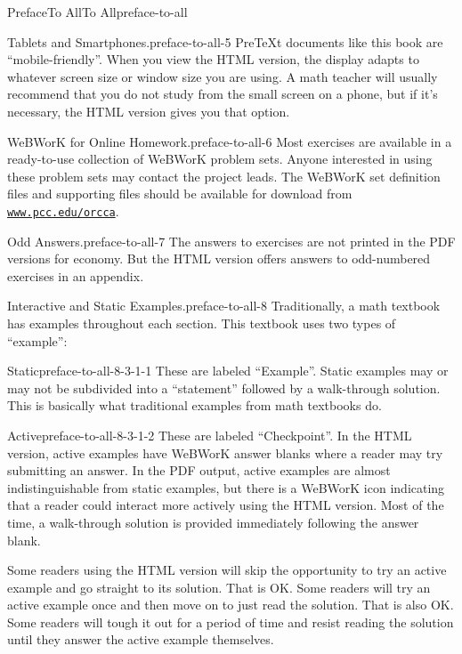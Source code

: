 \documentclass[twoside,10pt,]{book}
\numberwithin{equation}{section}
\begin{document}
\begin{preface}{Preface}{To All}{}{To All}{}{}{preface-to-all}
\begin{paragraphs}{Tablets and Smartphones.}{preface-to-all-5}
PreTeXt documents like this book are ``mobile-friendly''. When you view the HTML version, the display adapts to whatever screen size or window size you are using. A math teacher will usually recommend that you do not study from the small screen on a phone, but if it's necessary, the HTML version gives you that option.%
\end{paragraphs}%
\begin{paragraphs}{WeBWorK for Online Homework.}{preface-to-all-6}%
Most exercises are available in a ready-to-use collection of WeBWorK problem sets. Anyone interested in using these problem sets may contact the project leads. The WeBWorK set definition files and supporting files should be available for download from \href{https://www.pcc.edu/orcca}{\nolinkurl{www.pcc.edu/orcca}}.%
\end{paragraphs}%
\begin{paragraphs}{Odd Answers.}{preface-to-all-7}%
The answers to exercises are not printed in the PDF versions for economy. But the HTML version offers answers to odd-numbered exercises in an appendix.%
\end{paragraphs}%
\begin{paragraphs}{Interactive and Static Examples.}{preface-to-all-8}%
Traditionally, a math textbook has examples throughout each section. This textbook uses two types of ``example'':%
\par
%
\begin{descriptionlist}
\begin{dlinarrow}{Static}{preface-to-all-8-3-1-1}%
These are labeled ``Example''. Static examples may or may not be subdivided into a ``statement'' followed by a walk-through solution. This is basically what traditional examples from math textbooks do.%
\end{dlinarrow}%
\begin{dlinarrow}{Active}{preface-to-all-8-3-1-2}%
These are labeled ``Checkpoint''. In the HTML version, active examples have WeBWorK answer blanks where a reader may try submitting an answer. In the PDF output, active examples are almost indistinguishable from static examples, but there is a WeBWorK icon indicating that a reader could interact more actively using the HTML version. Most of the time, a walk-through solution is provided immediately following the answer blank.%
\par
Some readers using the HTML version will skip the opportunity to try an active example and go straight to its solution. That is OK. Some readers will try an active example once and then move on to just read the solution. That is also OK. Some readers will tough it out for a period of time and resist reading the solution until they answer the active example themselves.%

\end{dlinarrow}
\end{descriptionlist}
\end{paragraphs}
\end{preface}
\end{document}
